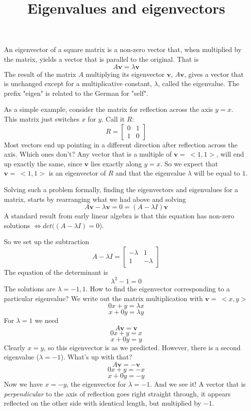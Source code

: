 \documentclass[11pt, oneside]{article}
\title{Eigenvalues and eigenvectors}
\date{}
\begin{document}
\maketitle
\Large


An eigenvector of a square matrix is a non-zero vector that, when multiplied by the matrix, yields a vector that is parallel to the original.  That is
\[ A\mathbf{v} = \lambda \mathbf{v} \]
The result of the matrix $A$ multiplying its eigenvector $\mathbf{v}$, $A \mathbf{v}$, gives a vector that is unchanged except for a multiplicative constant, $\lambda$, called the eigenvalue.  The prefix "eigen" is related to the German for "self".

As a simple example, consider the matrix for reflection across the axis $y=x$.  This matrix just switches $x$ for $y$.  Call it $R$:
\[
R = 
\begin{bmatrix}
0 & 1  \\  
1 & 0  
\end{bmatrix}
\]
Most vectors end up pointing in a different direction after reflection across the axis.  Which ones don't?  Any vector that is a multiple of $\mathbf{v}= \ <1,1> $, will end up exactly the same, since $\mathbf{v}$ lies exactly along $y=x$.  So we expect that $\mathbf{v}=\ <1,1>$ is an eigenvector of $R$ and that the eigenvalue $\lambda$ will be equal to $1$.

Solving such a problem formally, finding the eigenvectors and eigenvalues for a matrix, starts by rearranging what we had above and solving
\[ A\mathbf{v} - \lambda \mathbf{v} = 0 = (A-\lambda I)\mathbf{v} \]
A standard result from early linear algebra is that this equation has non-zero solutions $\iff det((A-\lambda I) = 0$).

So we set up the subtraction
\[
A-\lambda I = 
\begin{bmatrix}
-\lambda & 1  \\  
1 & -\lambda  
\end{bmatrix}
\]
The equation of the determinant is 
\[ \lambda^2 - 1 = 0  \]
The solutions are $\lambda = -1,1$.  How to find the eigenvector corresponding to a particular eigenvalue?  We write out the matrix multiplication with $\mathbf{v} = \ <x,y>$
\[ 0x + y = \lambda x \]
\[ x + 0y = \lambda y \]
For $\lambda=1$ we need 
\[ A \mathbf{v} = \mathbf{v}  \]
\[ 0x + y = x \]
\[ x + 0y = y \]
Clearly $x=y$, so this eigenvector is as we predicted.  However, there is a second eigenvalue ($\lambda = -1$).  What's up with that?
\[ A \mathbf{v} = -\mathbf{v}  \]
\[ 0x + y = -x \]
\[ x + 0y = -y \]
Now we have $x=-y$, the eigenvector for $\lambda=-1$.  And we see it!  A vector that is \emph{perpendicular} to the axis of reflection goes right straight through, it appears reflected on the other side with identical length, but multiplied by $-1$.
\end{document}

